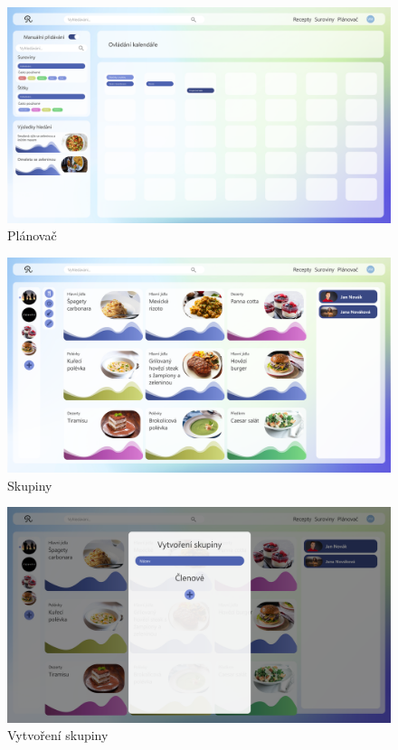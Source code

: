 \begin{figure}[h]
    \includegraphics[width=\textwidth]{pdf/adobexd/planovac}
    \caption{Plánovač} \label{picture:recipeo:planovac}
\end{figure}

\begin{figure}[h]
    \includegraphics[width=\textwidth]{pdf/adobexd/skupiny}
    \caption{Skupiny} \label{picture:recipeo:skupiny}
\end{figure}

\begin{figure}[h]
    \includegraphics[width=\textwidth]{pdf/adobexd/skupiny-vytvoreni}
    \caption{Vytvoření skupiny} \label{picture:recipeo:skupiny-vytvoreni}
\end{figure}
